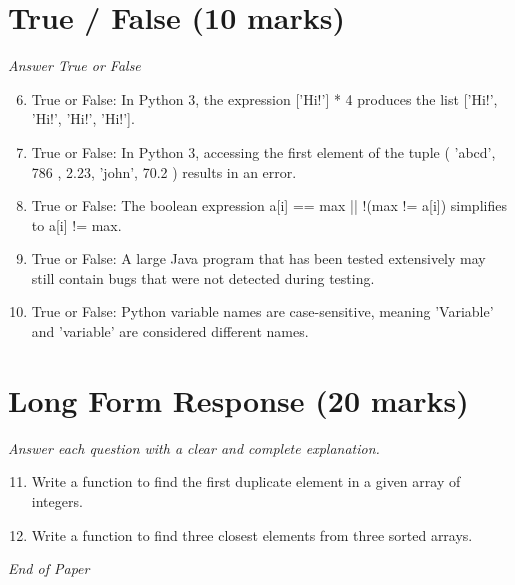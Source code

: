\documentclass[12pt]{article}
\begin{document}
\section*{True / False (10 marks)}
\textit{Answer True or False}
\begin{enumerate}[label=\arabic*.]
\setcounter{enumi}{5}
\item True or False: In Python 3, the expression ['Hi!'] * 4 produces the list ['Hi!', 'Hi!', 'Hi!', 'Hi!'].
\item True or False: In Python 3, accessing the first element of the tuple ( 'abcd', 786 , 2.23, 'john', 70.2 ) results in an error.
\item True or False: The boolean expression a[i] == max || !(max != a[i]) simplifies to a[i] != max.
\item True or False: A large Java program that has been tested extensively may still contain bugs that were not detected during testing.
\item True or False: Python variable names are case-sensitive, meaning 'Variable' and 'variable' are considered different names.
\end{enumerate}

\section*{Long Form Response (20 marks)}
\textit{Answer each question with a clear and complete explanation.}
\begin{enumerate}[label=\arabic*.]
\setcounter{enumi}{10}
\item Write a function to find the first duplicate element in a given array of integers.
\item Write a function to find three closest elements from three sorted arrays.
\end{enumerate}

\vfill
\noindent\textit{End of Paper}
\end{document}
